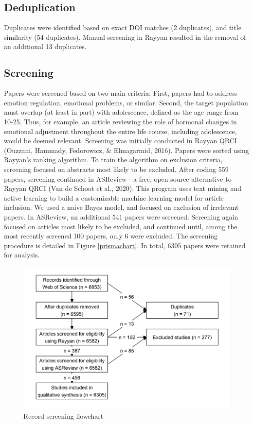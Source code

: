 \documentclass[
  english,
  man]{apa6}
\begin{document}
\hypertarget{deduplication}{%
\subsection{Deduplication}\label{deduplication}}

Duplicates were identified based on exact DOI matches (2
duplicates), and title similarity (54 duplicates).
Manual screening in Rayyan resulted in the removal of an additional 13 duplicates.

\hypertarget{screening}{%
\subsection{Screening}\label{screening}}

Papers were screened based on two main criteria:
First, papers had to address emotion regulation, emotional problems, or similar.
Second, the target population must overlap (at least in part) with adolescence, defined as the age range from 10-25.
Thus, for example, an article reviewing the role of hormonal changes in emotional adjustment throughout the entire life course, including adolescence, would be deemed relevant.
Screening was initially conducted in Rayyan QRCI (Ouzzani, Hammady, Fedorowicz, \& Elmagarmid, 2016).
Papers were sorted using Rayyan's ranking algorithm.
To train the algorithm on exclusion criteria, screening focused on abstracts most likely to be excluded.
After coding 559 papers, screening continued in ASReview - a free, open source alternative to Rayyan QRCI (Van de Schoot et al., 2020).
This program uses text mining and active learning to build a customizable machine learning model for article inclusion.
We used a naive Bayes model, and focused on exclusion of irrelevant papers.
In ASReview, an additional 541 papers were screened.
Screening again focused on articles most likely to be excluded, and continued until, among the most recently screened 100 papers, only 6 were excluded.
The screening procedure is detailed in Figure \ref{prismachart}.
In total, 6305 papers were retained for analysis.

\begin{figure}
\includegraphics[width=6.5in]{prismachart} \caption{Record screening flowchart}\label{fig:prismachart}
\end{figure}
\end{document}
